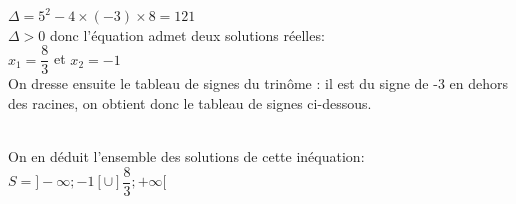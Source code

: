 \documentclass[12pt,a4paper]{book}
\begin{document}
\begin{enumMet}
    $\Delta=5^{2}-4 \times(-3) \times 8=121$\\
    $\Delta>0$ donc l'équation admet deux solutions réelles:\\ $x_{1}=\dfrac{8}{3}$ et $x_{2}=-1$\\
    On dresse ensuite le tableau de signes du trinôme : il est du signe de -3 en dehors des racines, on obtient donc le tableau de signes ci-dessous.\\
    \\
    On en déduit l'ensemble des solutions de cette inéquation:
    $S=]-\infty ;-1[\cup] \dfrac{8}{3} ;+\infty[$
\end{enumMet}
\end{document}

